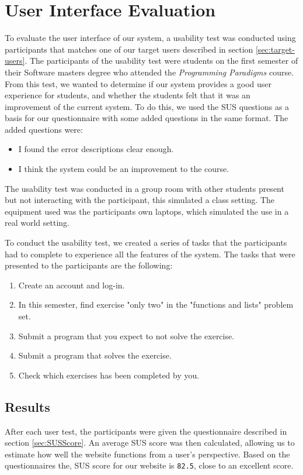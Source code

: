 \section{User Interface Evaluation} \label{UIEval}
To evaluate the user interface of our system, a usability test was conducted using participants that matches one of our target users described in section \ref{sec:target-users}.
The participants of the usability test were students on the first semester of their Software masters degree who attended the \textit{Programming Paradigms} course.
From this test, we wanted to determine if our system provides a good user experience for students, and whether the students felt that it was an improvement of the current system.
To do this, we used the SUS questions as a basis for our questionnaire with some added questions in the same format. The added questions were:
\begin{itemize}
    \item I found the error descriptions clear enough.
    \item I think the system could be an improvement to the course.
\end{itemize}

The usability test was conducted in a group room with other students present but not interacting with the participant, this simulated a class setting.
The equipment used was the participants own laptops, which simulated the use in a real world setting.

To conduct the usability test, we created a series of tasks that the participants had to complete to experience all the features of the system.
The tasks that were presented to the participants are the following:
\begin{enumerate}
    \item Create an account and log-in.
    \item In this semester, find exercise "only two" in the "functions and lists" problem set.
    \item Submit a program that you expect to not solve the exercise.
    \item Submit a program that solves the exercise.
    \item Check which exercises has been completed by you.
\end{enumerate}


\subsection{Results} \label{UiResults}
After each user test, the participants were given the questionnaire described in section \ref{sec:SUSScore}.
An average SUS score was then calculated, allowing us to estimate how well the website functions from a user's perspective.
Based on the questionnaires the, SUS score for our website is \texttt{82.5}, close to an excellent score.

